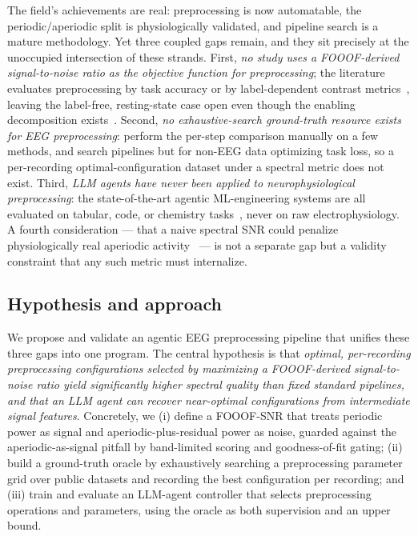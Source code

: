The field's achievements are real: preprocessing is now automatable, the periodic/aperiodic split is physiologically validated, and pipeline search is a mature methodology. Yet three coupled gaps remain, and they sit precisely at the unoccupied intersection of these strands. First, \emph{no study uses a FOOOF-derived signal-to-noise ratio as the objective function for preprocessing}; the literature evaluates preprocessing by task accuracy or by label-dependent contrast metrics~\cite{RobbinsEtAl2020, Delorme2023}, leaving the label-free, resting-state case open even though the enabling decomposition exists~\cite{DonoghueEtAl2020b}. Second, \emph{no exhaustive-search ground-truth resource exists for EEG preprocessing}: \citet{CoelliEtAl2023} perform the per-step comparison manually on a few methods, and \citet{MartinezEtAl2023} search pipelines but for non-EEG data optimizing task loss, so a per-recording optimal-configuration dataset under a spectral metric does not exist. Third, \emph{LLM agents have never been applied to neurophysiological preprocessing}: the state-of-the-art agentic ML-engineering systems are all evaluated on tabular, code, or chemistry tasks~\cite{GuoEtAl2024, ChiEtAl2024, TriratEtAl2024, JiangEtAl2025}, never on raw electrophysiology. A fourth consideration --- that a naive spectral SNR could penalize physiologically real aperiodic activity~\cite{LendnerEtAl2020, GersterEtAl2022} --- is not a separate gap but a validity constraint that any such metric must internalize.

\subsection{Hypothesis and approach}

We propose and validate an agentic EEG preprocessing pipeline that unifies these three gaps into one program. The central hypothesis is that \emph{optimal, per-recording preprocessing configurations selected by maximizing a FOOOF-derived signal-to-noise ratio yield significantly higher spectral quality than fixed standard pipelines, and that an LLM agent can recover near-optimal configurations from intermediate signal features}. Concretely, we (i) define a FOOOF-SNR that treats periodic power as signal and aperiodic-plus-residual power as noise, guarded against the aperiodic-as-signal pitfall by band-limited scoring and goodness-of-fit gating; (ii) build a ground-truth oracle by exhaustively searching a preprocessing parameter grid over public datasets and recording the best configuration per recording; and (iii) train and evaluate an LLM-agent controller that selects preprocessing operations and parameters, using the oracle as both supervision and an upper bound.


